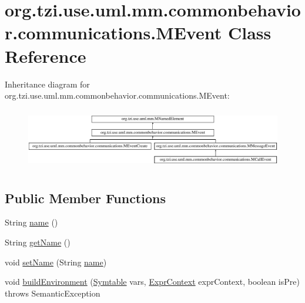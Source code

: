 \hypertarget{classorg_1_1tzi_1_1use_1_1uml_1_1mm_1_1commonbehavior_1_1communications_1_1_m_event}{\section{org.\-tzi.\-use.\-uml.\-mm.\-commonbehavior.\-communications.\-M\-Event Class Reference}
\label{classorg_1_1tzi_1_1use_1_1uml_1_1mm_1_1commonbehavior_1_1communications_1_1_m_event}
}
Inheritance diagram for org.\-tzi.\-use.\-uml.\-mm.\-commonbehavior.\-communications.\-M\-Event\-:\begin{figure}[H]
\begin{center}
\leavevmode
\includegraphics[height=2.698795cm]{classorg_1_1tzi_1_1use_1_1uml_1_1mm_1_1commonbehavior_1_1communications_1_1_m_event}
\end{center}
\end{figure}
\subsection*{Public Member Functions}
\begin{DoxyCompactItemize}
\item 
String \hyperlink{classorg_1_1tzi_1_1use_1_1uml_1_1mm_1_1commonbehavior_1_1communications_1_1_m_event_a66ae7d2dae1527a28a148cc074e62529}{name} ()
\item 
String \hyperlink{classorg_1_1tzi_1_1use_1_1uml_1_1mm_1_1commonbehavior_1_1communications_1_1_m_event_af8fb8c1276f1b60a79c07550c8427652}{get\-Name} ()
\item 
void \hyperlink{classorg_1_1tzi_1_1use_1_1uml_1_1mm_1_1commonbehavior_1_1communications_1_1_m_event_aa036f1829768b9e8a316c964feb4f988}{set\-Name} (String \hyperlink{classorg_1_1tzi_1_1use_1_1uml_1_1mm_1_1commonbehavior_1_1communications_1_1_m_event_ab3c4450cd381f85fb880c7b738f660d3}{name})
\item 
void \hyperlink{classorg_1_1tzi_1_1use_1_1uml_1_1mm_1_1commonbehavior_1_1communications_1_1_m_event_a338d704ae83fc30a65984c023b4a954c}{build\-Environment} (\hyperlink{classorg_1_1tzi_1_1use_1_1parser_1_1_symtable}{Symtable} vars, \hyperlink{classorg_1_1tzi_1_1use_1_1parser_1_1_expr_context}{Expr\-Context} expr\-Context, boolean is\-Pre)  throws Semantic\-Exception 
\end{DoxyCompactItemize}
